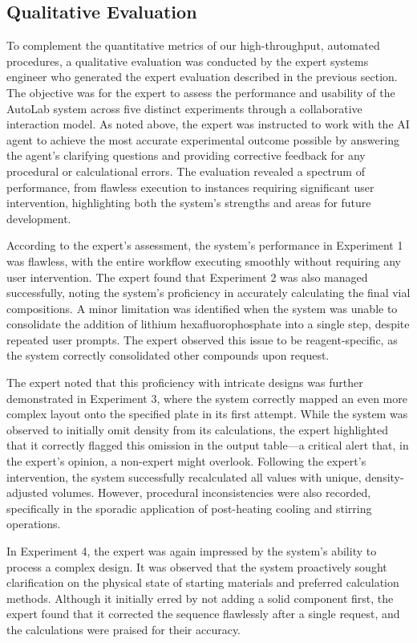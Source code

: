 \documentclass[sn-nature, twocolumn]{sn-jnl}%
\theoremstyle{thmstyleone}%
\theoremstyle{thmstyletwo}%
\theoremstyle{thmstylethree}%
\begin{document}
\subsection{Qualitative Evaluation}

To complement the quantitative metrics of our high-throughput, automated procedures, a qualitative evaluation was conducted by the expert systems engineer who generated the expert evaluation described in the previous section. The objective was for the expert to assess the performance and usability of the AutoLab system across five distinct experiments through a collaborative interaction model. As noted above, the expert was instructed to work with the AI agent to achieve the most accurate experimental outcome possible by answering the agent's clarifying questions and providing corrective feedback for any procedural or calculational errors. The evaluation revealed a spectrum of performance, from flawless execution to instances requiring significant user intervention, highlighting both the system's strengths and areas for future development.

According to the expert's assessment, the system's performance in Experiment 1 was flawless, with the entire workflow executing smoothly without requiring any user intervention. The expert found that Experiment 2 was also managed successfully, noting the system's proficiency in accurately calculating the final vial compositions. A minor limitation was identified when the system was unable to consolidate the addition of lithium hexafluorophosphate into a single step, despite repeated user prompts. The expert observed this issue to be reagent-specific, as the system correctly consolidated other compounds upon request.

The expert noted that this proficiency with intricate designs was further demonstrated in Experiment 3, where the system correctly mapped an even more complex layout onto the specified plate in its first attempt. While the system was observed to initially omit density from its calculations, the expert highlighted that it correctly flagged this omission in the output table—a critical alert that, in the expert's opinion, a non-expert might overlook. Following the expert's intervention, the system successfully recalculated all values with unique, density-adjusted volumes. However, procedural inconsistencies were also recorded, specifically in the sporadic application of post-heating cooling and stirring operations.

In Experiment 4, the expert was again impressed by the system's ability to process a complex design. It was observed that the system proactively sought clarification on the physical state of starting materials and preferred calculation methods. Although it initially erred by not adding a solid component first, the expert found that it corrected the sequence flawlessly after a single request, and the calculations were praised for their accuracy.
\end{document}
